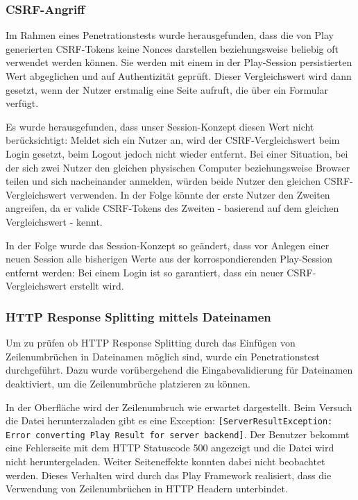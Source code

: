 \documentclass[12pt,DIV14,BCOR10mm,a4paper,parskip=half-,headsepline,headinclude,english,ngerman,bibliography=totocnumbered]{scrreprt}
\begin{document}
\subsubsection{CSRF-Angriff}
Im Rahmen eines Penetrationstests wurde herausgefunden, dass die von Play generierten CSRF-Tokens keine Nonces darstellen beziehungsweise beliebig oft verwendet werden können. Sie werden mit einem in der Play-Session persistierten Wert abgeglichen und auf Authentizität geprüft. Dieser Vergleichswert wird dann gesetzt, wenn der Nutzer erstmalig eine Seite aufruft, die über ein Formular verfügt.

Es wurde herausgefunden, dass unser Session-Konzept diesen Wert nicht berücksichtigt: Meldet sich ein Nutzer an, wird der CSRF-Vergleichswert beim Login gesetzt, beim Logout jedoch nicht wieder entfernt. Bei einer Situation, bei der sich zwei Nutzer den gleichen physischen Computer beziehungsweise Browser teilen und sich nacheinander anmelden, würden beide Nutzer den gleichen CSRF-Vergleichswert verwenden. In der Folge könnte der erste Nutzer den Zweiten angreifen, da er valide CSRF-Tokens des Zweiten - basierend auf dem gleichen Vergleichswert - kennt.

In der Folge wurde das Session-Konzept so geändert, dass vor Anlegen einer neuen Session alle bisherigen Werte aus der korrospondierenden Play-Session entfernt werden: Bei einem Login ist so garantiert, dass ein neuer CSRF-Vergleichswert erstellt wird.


\subsubsection{HTTP Response Splitting mittels Dateinamen}
Um zu prüfen ob HTTP Response Splitting durch das Einfügen von Zeilenumbrüchen in Dateinamen möglich sind, wurde ein Penetrationstest durchgeführt. Dazu wurde vorübergehend die Eingabevalidierung für Dateinamen deaktiviert, um die Zeilenumbrüche platzieren zu können.

In der Oberfläche wird der Zeilenumbruch wie erwartet dargestellt. Beim Versuch die Datei herunterzaladen gibt es eine Exception: \texttt{[ServerResultException: Error converting Play Result for server backend]}. Der Benutzer bekommt eine Fehlerseite mit dem HTTP Statuscode 500 angezeigt und die Datei wird nicht heruntergeladen. Weiter Seiteneffekte konnten dabei nicht beobachtet werden. Dieses Verhalten wird durch das Play Framework realisiert, dass die Verwendung von Zeilenumbrüchen in HTTP Headern unterbindet.
\end{document}
